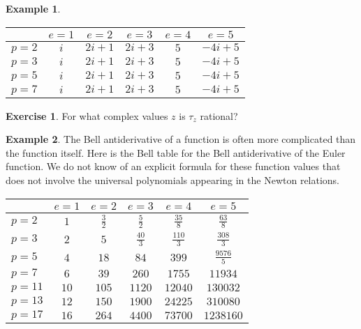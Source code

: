 \documentclass[a4paper]{article}
\theoremstyle{definition}
\newtheorem{example}{Example}[section]
\newtheorem{exercise}{Exercise}[section]
\theoremstyle{remark}
\begin{document}
\begin{example}
\begin{center}
\begin{tabular}{| l | | c | c | c | c | c |}
\hline
& $e = 1$ & $e = 2$ & $e = 3$ & $e = 4$ & $e = 5$\\
\hline
\hline
$p = 2$ & $i$ & $2 i + 1$ & $2 i + 3$ & $5$ & $-4 i + 5$ \\
\hline
$p = 3$ & $i$ & $2 i + 1$ & $2 i + 3$ & $5$ & $-4 i + 5$ \\
\hline
$p = 5$ & $i$ & $2 i + 1$ & $2 i + 3$ & $5$ & $-4 i + 5$ \\
\hline
$p = 7$ & $i$ & $2 i + 1$ & $2 i + 3$ & $5$ & $-4 i + 5$ \\
\hline
\end{tabular}
\end{center}
\end{example}

\begin{exercise}
For what complex values $z$ is $\tau_z$ rational?
\end{exercise}

\begin{example}
The Bell antiderivative of a function is often more complicated than the function itself. Here is the Bell table for the Bell antiderivative of the Euler function. We do not know of an explicit formula for these function values that does not involve the universal polynomials appearing in the Newton relations.
\vskip10pt
\begin{center}

\begin{tabular}{| l | | c | c | c | c | c |}
\hline
& $e = 1$ & $e = 2$ & $e = 3$ & $e = 4$ & $e = 5$\\
\hline
\hline
$p = 2$ & $1$ & $\frac{3}{2}$ & $\frac{5}{2}$ & $\frac{35}{8}$ & $\frac{63}{8}$ \\
\hline
$p = 3$ & $2$ & $5$ & $\frac{40}{3}$ & $\frac{110}{3}$ & $\frac{308}{3}$ \\
\hline
$p = 5$ & $4$ & $18$ & $84$ & $399$ & $\frac{9576}{5}$ \\
\hline
$p = 7$ & $6$ & $39$ & $260$ & $1755$ & $11934$ \\
\hline
$p = 11$ & $10$ & $105$ & $1120$ & $12040$ & $130032$ \\
\hline
$p = 13$ & $12$ & $150$ & $1900$ & $24225$ & $310080$ \\
\hline
$p = 17$ & $16$ & $264$ & $4400$ & $73700$ & $1238160$ \\
\hline
\end{tabular}
\end{center}

\end{example}
\end{document}
